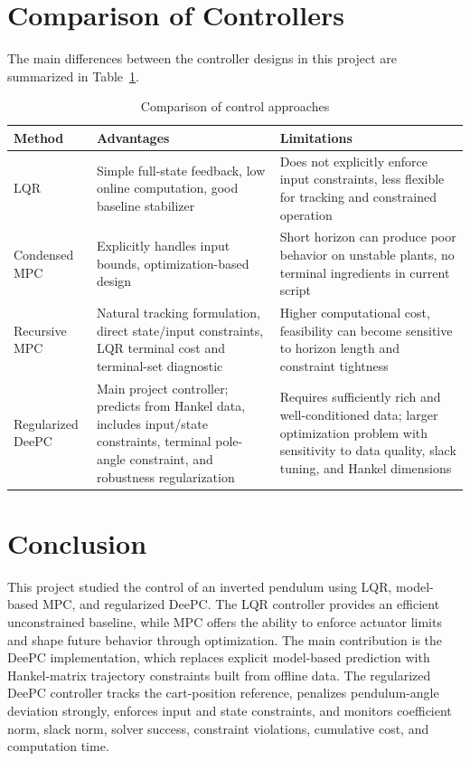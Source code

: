 \documentclass[conference]{IEEEtran}
\begin{document}
\section{Comparison of Controllers}
The main differences between the controller designs in this project are summarized in Table~\ref{tab:comparison}.

\begin{table}[t]
\centering
\caption{Comparison of control approaches}
\label{tab:comparison}
\begin{tabular}{>{\raggedright\arraybackslash}p{} >{\raggedright\arraybackslash}p{} >{\raggedright\arraybackslash}p{}}
\toprule
Method & Advantages & Limitations \\
\midrule
LQR & Simple full-state feedback, low online computation, good baseline stabilizer & Does not explicitly enforce input constraints, less flexible for tracking and constrained operation \\
Condensed MPC & Explicitly handles input bounds, optimization-based design & Short horizon can produce poor behavior on unstable plants, no terminal ingredients in current script \\
Recursive MPC & Natural tracking formulation, direct state/input constraints, LQR terminal cost and terminal-set diagnostic & Higher computational cost, feasibility can become sensitive to horizon length and constraint tightness \\
Regularized DeePC & Main project controller; predicts from Hankel data, includes input/state constraints, terminal pole-angle constraint, and robustness regularization & Requires sufficiently rich and well-conditioned data; larger optimization problem with sensitivity to data quality, slack tuning, and Hankel dimensions \\
\bottomrule
\end{tabular}
\end{table}

\section{Conclusion}
This project studied the control of an inverted pendulum using LQR, model-based MPC, and regularized DeePC. The LQR controller provides an efficient unconstrained baseline, while MPC offers the ability to enforce actuator limits and shape future behavior through optimization. The main contribution is the DeePC implementation, which replaces explicit model-based prediction with Hankel-matrix trajectory constraints built from offline data. The regularized DeePC controller tracks the cart-position reference, penalizes pendulum-angle deviation strongly, enforces input and state constraints, and monitors coefficient norm, slack norm, solver success, constraint violations, cumulative cost, and computation time.
\end{document}
